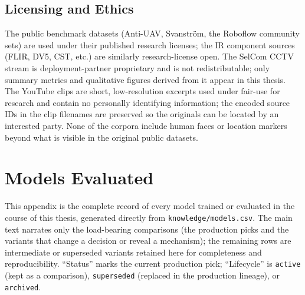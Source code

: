 \documentclass[12pt,a4paper,oneside,openright]{book}
\begin{document}
\section{Licensing and Ethics}

The public benchmark datasets (Anti-UAV, Svanstr\"om, the Roboflow community sets) are used under their published research licenses; the IR component sources (FLIR, DV5, CST, etc.) are similarly research-license open. The SelCom CCTV stream is deployment-partner proprietary and is not redistributable; only summary metrics and qualitative figures derived from it appear in this thesis. The YouTube clips are short, low-resolution excerpts used under fair-use for research and contain no personally identifying information; the encoded source IDs in the clip filenames are preserved so the originals can be located by an interested party. None of the corpora include human faces or location markers beyond what is visible in the original public datasets.

\chapter{Models Evaluated}
\label{app:models}

This appendix is the complete record of every model trained or evaluated in the course of this thesis, generated directly from \texttt{knowledge/models.csv}. The main text narrates only the load-bearing comparisons (the production picks and the variants that change a decision or reveal a mechanism); the remaining rows are intermediate or superseded variants retained here for completeness and reproducibility. ``Status'' marks the current production pick; ``Lifecycle'' is \texttt{active} (kept as a comparison), \texttt{superseded} (replaced in the production lineage), or \texttt{archived}.
\end{document}
